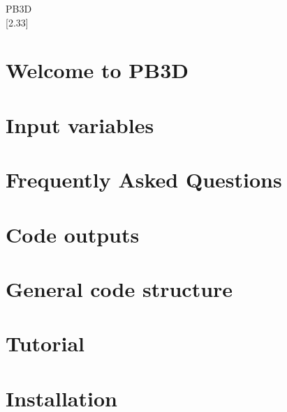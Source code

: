 \documentclass[twoside]{book}
\newcommand{\+}{\discretionary{\mbox{\scriptsize$\hookleftarrow$}}{}{}}
\newcommand{\clearemptydoublepage}{%
  \newpage{\pagestyle{empty}\cleardoublepage}%
}
\begin{document}
\hypersetup{pageanchor=false,
             bookmarksnumbered=true,
             pdfencoding=unicode
            }
\begin{titlepage}
\vspace*{7cm}
\begin{center}%
{\color{stylecolor} \TitleFont\fontsize{72}{80} \selectfont P\+B3D \\}
\vspace*{1cm}
{\large \mbox{[}2.\+33\mbox{]} }\\
\vspace*{1cm}
\end{center}
\end{titlepage}
\clearemptydoublepage
{}
\tableofcontents
\clearemptydoublepage
{}
\hypersetup{pageanchor=true}

\chapter{Welcome to P\+B3D}
\label{index}\hypertarget{index}{}
\chapter{Input variables}
\label{page_inputs}

\chapter{Frequently Asked Questions}
\label{page_faq}

\chapter{Code outputs}
\label{page_outputs}

\chapter{General code structure}
\label{page_overview}

\chapter{Tutorial}
\label{page_tutorial}

\chapter{Installation}
\label{page_installation}

\end{document}

